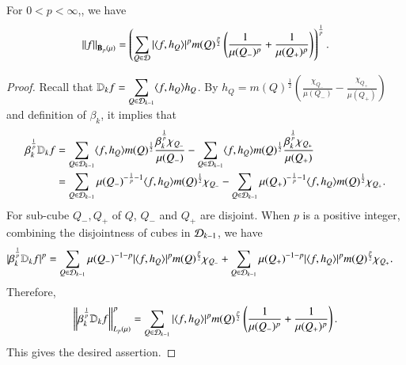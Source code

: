 \documentclass[leqno]{amsart}
\begin{document}
\begin{lemma}\label{besov equi-version}
For $0<p<\infty$,, we have
\begin{align*}
\left\| f \right\|_{\dot{\mathbf B}_{p}(\mu)}=
\left(\sum_{Q\in{\mathcal D}}|\langle f,h_{Q} \rangle|^{p}m(Q)^{\frac{p}{2}}
\left(\frac{1}{\mu(Q_{-})^{p}}+\frac{1}{\mu(Q_{+})^{p}}\right)\right)^{\frac{1}{p}}.
\end{align*}
\end{lemma}
\begin{proof}
Recall that $\displaystyle\mathbb{D}_{k}f=\sum_{Q\in{\mathcal D}_{k-1}}\langle f,h_{Q} \rangle h_{Q}$. By $h_{Q}=m(Q)^{\frac{1}{2}}\left(\frac{\chi_{Q_{-}}}{\mu(Q_{-})}-\frac{\chi_{Q_{+}}}{\mu(Q_{+})}\right)$ and definition of $\beta_{k}$, it implies that
\begin{align*}
\beta_{k}^{\frac{1}{p}}\mathbb{D}_{k}f
&=\sum_{Q\in{\mathcal D}_{k-1}}\langle f,h_{Q} \rangle m(Q)^{\frac{1}{2}}\frac{\beta_{k}^{\frac{1}{p}}\chi_{Q_{-}}}{\mu(Q_{-})}-
\sum_{Q\in{\mathcal D}_{k-1}}\langle f,h_{Q} \rangle m(Q)^{\frac{1}{2}}\frac{\beta_{k}^{\frac{1}{p}}\chi_{Q_{+}}}{\mu(Q_{+})}\\
&=\sum_{Q\in{\mathcal D}_{k-1}}\mu(Q_{-})^{-\frac{1}{p}-1}\langle f,h_{Q} \rangle m(Q)^{\frac{1}{2}}\chi_{Q_{-}}-
\sum_{Q\in{\mathcal D}_{k-1}}\mu(Q_{+})^{-\frac{1}{p}-1}\langle f,h_{Q} \rangle m(Q)^{\frac{1}{2}}\chi_{Q_{+}}.
\end{align*}
For sub-cube $Q_{-},Q_{+}$ of $Q$, $Q_{-}$ and $Q_{+}$ are  disjoint.  When $p$ is a positive integer, combining the disjointness of cubes in ${\mathcal D}_{k-1}$, we have
\begin{align*}
|\beta_{k}^{\frac{1}{p}}\mathbb{D}_{k}f|^{p}
&=\sum_{Q\in{\mathcal D}_{k-1}}\mu(Q_{-})^{-1-p}|\langle f,h_{Q} \rangle|^{p}m(Q)^{\frac{p}{2}}\chi_{Q_{-}}+
\sum_{Q\in{\mathcal D}_{k-1}}\mu(Q_{+})^{-1-p}|\langle f,h_{Q} \rangle|^{p}m(Q)^{\frac{p}{2}}\chi_{Q_{+}}.
\end{align*}
Therefore,
\begin{align*}
\left\| \beta_{k}^{\frac{1}{p}}\mathbb{D}_{k}f \right\|_{L_{p}(\mu)}^{p}
=\sum_{Q\in{\mathcal D}_{k-1}}|\langle f,h_{Q} \rangle|^{p}m(Q)^{\frac{p}{2}}
\left(\frac{1}{\mu(Q_{-})^{p}}+\frac{1}{\mu(Q_{+})^{p}}\right).
\end{align*}
This gives the desired assertion.

\end{proof}
\end{document}
